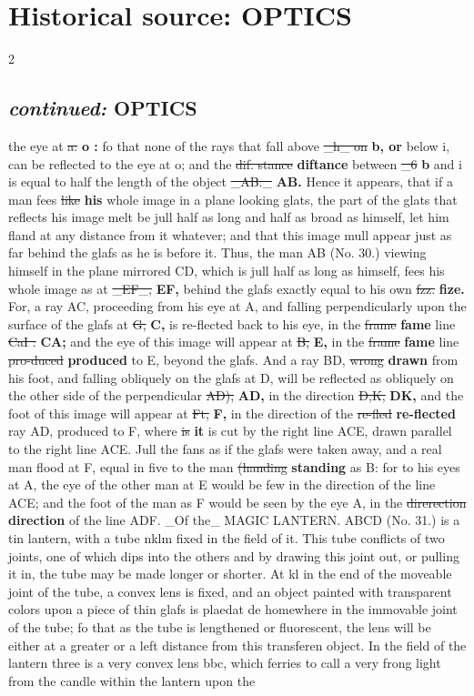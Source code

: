 \documentclass[10pt]{article}
\begin{document}
\section*{Historical source: OPTICS}
\begin{multicols}{2}
\subsection*{\textit{continued:} OPTICS}
the eye at \sout{a:} \textbf{o :} fo that none of the rays that fall above \sout{\_h\_ on} \textbf{b, or} below i, can be reflected to the eye at o; and the \sout{dif. stance} \textbf{diftance} between \sout{\_6} \textbf{b} and i is equal to half the length of the object \sout{\_AB.\_} \textbf{AB.} Hence it appears, that if a man fees \sout{like} \textbf{his} whole image in a plane looking glats, the part of the glats that reflects his image melt be jull half as long and half as broad as himself, let him fland at any distance from it whatever; and that this image mull appear just as far behind the glafs as he is before it. Thus, the man AB (No. 30.) viewing himself in the plane mirrored CD, which is jull half as long as himself, fees his whole image as at \sout{\_EF\_,} \textbf{EF,} behind the glafs exactly equal to his own \sout{fzz.} \textbf{fize.} For, a ray AC, proceeding from his eye at A, and falling perpendicularly upon the surface of the glafs at \sout{G,} \textbf{C,} is re-flected back to his eye, in the \sout{frame} \textbf{fame} line \sout{CaI :} \textbf{CA;} and the eye of this image will appear at \sout{B,} \textbf{E,} in the \sout{frame} \textbf{fame} line \sout{pro-duced} \textbf{produced} to E, beyond the glafs. And a ray BD, \sout{wrong} \textbf{drawn} from his foot, and falling obliquely on the glafs at D, will be reflected as obliquely on the other side of the perpendicular \sout{AD),} \textbf{AD,} in the direction \sout{D,K,} \textbf{DK,} and the foot of this image will appear at \sout{Ft,} \textbf{F,} in the direction of the \sout{re-fled} \textbf{re-flected} ray AD, produced to F, where \sout{is} \textbf{it} is cut by the right line ACE, drawn parallel to the right line ACE. Jull the fans as if the glafs were taken away, and a real man flood at F, equal in five to the man \sout{(handing} \textbf{standing} as B: for to his eyes at A, the eye of the other man at E would be few in the direction of the line ACE; and the foot of the man as F would be seen by the eye A, in the \sout{direrection} \textbf{direction} of the line ADF. \_Of the\_ MAGIC LANTERN. ABCD (No. 31.) is a tin lantern, with a tube nklm fixed in the field of it. This tube conflicts of two joints, one of which dips into the others and by drawing this joint out, or pulling it in, the tube may be made longer or shorter. At kl in the end of the moveable joint of the tube, a convex lens is fixed, and an object painted with transparent colors upon a piece of thin glafs is plaedat de homewhere in the immovable joint of the tube; fo that as the tube is lengthened or fluorescent, the lens will be either at a greater or a left distance from this transferen object. In the field of the lantern three is a very convex lens bbc, which ferries to call a very frong light from the candle within the lantern upon the 
\end{multicols}
\end{document}
